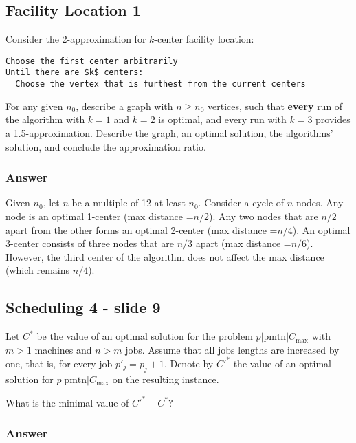 \documentclass{idc_msc}
\begin{document}
\subsection{Facility Location 1}

Consider the 2-approximation for \(k\)-center facility location:

\begin{lstlisting}[title={2-approximation for k-center}]
Choose the first center arbitrarily
Until there are $k$ centers:
  Choose the vertex that is furthest from the current centers
\end{lstlisting}

For any given \(n_0\), describe a graph with \(n \ge n_0\) vertices, such that \textbf{every} run of the algorithm with \(k=1\) and \(k=2\) is optimal, and every run with \(k=3\) provides a 1.5-approximation.
Describe the graph, an optimal solution, the algorithms' solution, and conclude the approximation ratio.

\subsubsection{Answer}

Given \(n_0\), let \(n\) be a multiple of 12 at least \(n_0\). Consider a cycle of \(n\) nodes.
Any node is an optimal 1-center (max distance =\(n/2\)).
Any two nodes that are \(n/2\) apart from the other forms an optimal 2-center (max distance =\(n/4\)).
An optimal 3-center consists of three nodes that are \(n/3\) apart (max distance =\(n/6\)).
However, the third center of the algorithm does not affect the max distance (which remains \(n/4\)).

\subsection{Scheduling 4 - slide 9}

Let \(C^*\) be the value of an optimal solution for the problem \(p|\text{pmtn}|C_{\max}\) with \(m>1\) machines and \(n>m\) jobs.
Assume that all jobs lengths are increased by one, that is, for every job \(p'_j=p_j+1\).
Denote by \(C'^*\) the value of an optimal solution for \(p|\text{pmtn}|C_{\max}\) on the resulting instance.

What is the minimal value of \(C'^* - C^*\)?

\subsubsection{Answer}
\end{document}

